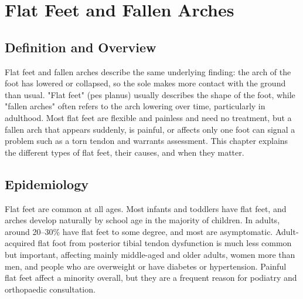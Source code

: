 \chapter{Flat Feet and Fallen Arches}

\section*{Definition and Overview}
Flat feet and fallen arches describe the same underlying finding: the arch of the foot has lowered or collapsed, so the sole makes more contact with the ground than usual. "Flat feet" (pes planus) usually describes the shape of the foot, while "fallen arches" often refers to the arch lowering over time, particularly in adulthood. Most flat feet are flexible and painless and need no treatment, but a fallen arch that appears suddenly, is painful, or affects only one foot can signal a problem such as a torn tendon and warrants assessment. This chapter explains the different types of flat feet, their causes, and when they matter.

\section*{Epidemiology}
Flat feet are common at all ages. Most infants and toddlers have flat feet, and arches develop naturally by school age in the majority of children. In adults, around 20--30\% have flat feet to some degree, and most are asymptomatic. Adult-acquired flat foot from posterior tibial tendon dysfunction is much less common but important, affecting mainly middle-aged and older adults, women more than men, and people who are overweight or have diabetes or hypertension. Painful flat feet affect a minority overall, but they are a frequent reason for podiatry and orthopaedic consultation.

